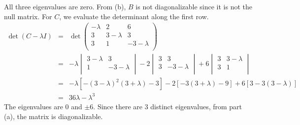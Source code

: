 \documentclass[a4paper]{article}
\begin{document}
\begin{ans}
\begin{enumerate}[label=(\alph*)]
All three eigenvalues are zero. From (b), $B$ is not diagonalizable since it is not the null matrix. For $C$, we evaluate the determinant along the first row.
\begin{eqnarray}
\det(C-\lambda I)&=&\det\begin{pmatrix}-\lambda&2&6\\3&3-\lambda&3\\3&1&-3-\lambda\\\end{pmatrix}\nonumber\\&=&-\lambda\begin{vmatrix}3-\lambda&3\\1&-3-\lambda\\\end{vmatrix}-2\begin{vmatrix}3&3\\3&-3-\lambda\\\end{vmatrix}+6\begin{vmatrix}3&3-\lambda\\3&1\\\end{vmatrix}\nonumber\\&=&-\lambda[-(3-\lambda)^2(3+\lambda)-3]-2[-3(3+\lambda)-9]+6[3-3(3-\lambda)]\nonumber\\&=&36\lambda-\lambda^3\nonumber
\end{eqnarray}
The eigenvalues are $0$ and $\pm 6$. Since there are 3 distinct eigenvalues, from part (a), the matrix is diagonalizable.
\end{enumerate}
\end{ans}
\newpage
\end{document}
